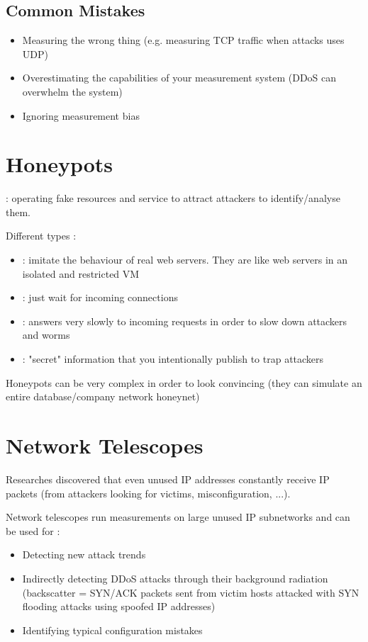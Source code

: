 \section{Common Mistakes}

\begin{itemize}
    \item Measuring the wrong thing (e.g. measuring TCP traffic when attacks uses UDP)
    \item Overestimating the capabilities of your measurement system (DDoS can overwhelm the system)
    \item Ignoring measurement bias
\end{itemize}

\begingroup
\let\clearpage\relax
\chapter{Honeypots}

 : operating fake resources and service to attract attackers to identify/analyse them.

Different types :
\begin{itemize}
    \item {} : imitate the behaviour of real web servers. They are like web servers in an isolated and restricted VM
    \item {} : just wait for incoming connections
    \item {} : answers very slowly to incoming requests in order to slow down attackers and worms
    \item {} : "secret" information that you intentionally publish to trap attackers
\end{itemize}

Honeypots can be very complex in order to look convincing (they can simulate an entire database/company network honeynet)

\chapter{Network Telescopes}

Researches discovered that even unused IP addresses constantly receive IP packets (from attackers looking for victims, misconfiguration, ...).

Network telescopes run measurements on large unused IP subnetworks and can be used for :
\begin{itemize}
    \item Detecting new attack trends
    \item Indirectly detecting DDoS attacks through their background radiation (backscatter = SYN/ACK packets sent from victim hosts attacked with SYN flooding attacks using spoofed IP addresses)
    \item Identifying typical configuration mistakes
\end{itemize}
\endgroup

